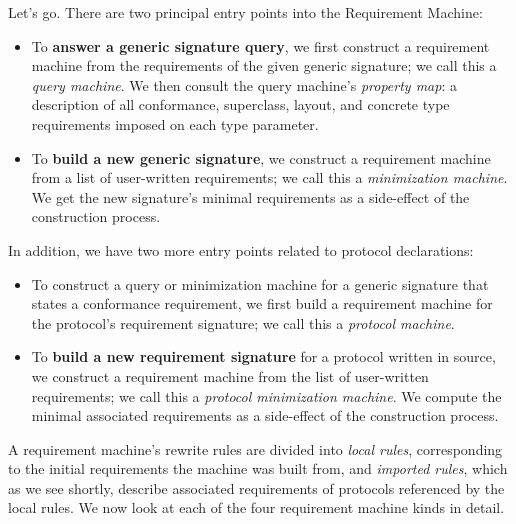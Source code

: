 \documentclass[../generics]{subfiles}
\begin{document}
Let's go. There are two principal entry points into the Requirement Machine:
\begin{itemize}
\item To \textbf{answer a generic signature query}, we first construct a requirement machine from the requirements of the given generic signature; we call this a \emph{query machine}. We then consult the query machine's \emph{property map}: a description of all conformance, superclass, layout, and concrete type requirements imposed on each type parameter.

\item To \textbf{build a new generic signature}, we construct a requirement machine from a list of user-written requirements; we call this a \emph{minimization machine}. We get the new signature's minimal requirements as a side-effect of the construction process.
\end{itemize}
In addition, we have two more entry points related to protocol declarations:
\begin{itemize}
\item To construct a query or minimization machine for a generic signature that states a conformance requirement, we first build a requirement machine for the protocol's requirement signature; we call this a \emph{protocol machine}.
\item To \textbf{build a new requirement signature} for a protocol written in source, we construct a requirement machine from the list of user-written requirements; we call this a \emph{protocol minimization machine}. We compute the minimal associated requirements as a side-effect of the construction process.
\end{itemize}

A requirement machine's rewrite rules are divided into \emph{local rules}, corresponding to the initial requirements the machine was built from, and \emph{imported rules}, which as we see shortly, describe associated requirements of protocols referenced by the local rules. We now look at each of the four requirement machine kinds in detail.
\end{document}
